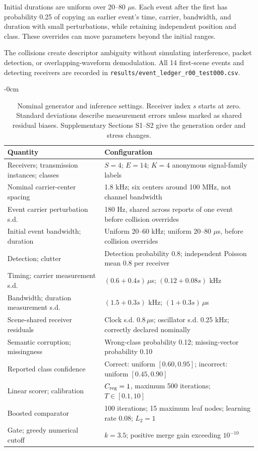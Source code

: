 Initial durations are uniform over 20--80 $\mu$s. Each event after the first has probability 0.25 of copying an earlier event's time, carrier, bandwidth, and duration with small perturbations, while retaining independent position and class. These overrides can move parameters beyond the initial ranges.

The collisions create descriptor ambiguity without simulating interference, packet detection, or overlapping-waveform demodulation. All 14 first-scene events and detecting receivers are recorded in \texttt{results/event\_ledger\_r00\_test000.csv}.

\begin{table}[!t]
\begin{adjustwidth}{-\extralength}{0cm}
\caption{Nominal generator and inference settings. Receiver index $s$ starts at zero. Standard deviations describe measurement errors unless marked as shared residual biases. Supplementary Sections S1--S2 give the generation order and stress changes.}\label{tab:configuration}
\small\renewcommand{\arraystretch}{1.12}
\begin{tabularx}{\linewidth}{@{}p{5.1cm}Y@{}}\toprule
Quantity & Configuration \\\midrule
Receivers; transmission instances; classes & $S=4$; $E=14$; $K=4$ anonymous signal-family labels \\
Nominal carrier-center spacing & 1.8 kHz; six centers around 100 MHz, not channel bandwidth \\
Event carrier perturbation s.d. & 180 Hz, shared across reports of one event before collision overrides \\
Initial event bandwidth; duration & Uniform 20--60 kHz; uniform 20--80 $\mu$s, before collision overrides \\
Detection; clutter & Detection probability 0.8; independent Poisson mean 0.8 per receiver \\
Timing; carrier measurement s.d. & $(0.6+0.4s)\,\mu$s; $(0.12+0.08s)$ kHz \\
Bandwidth; duration measurement s.d. & $(1.5+0.3s)$ kHz; $(1+0.3s)\,\mu$s \\
Scene-shared receiver residuals & Clock s.d. $0.8\,\mu$s; oscillator s.d. 0.25 kHz; correctly declared nominally \\
Semantic corruption; missingness & Wrong-class probability 0.12; missing-vector probability 0.10 \\
Reported class confidence & Correct: uniform $[0.60,0.95]$; incorrect: uniform $[0.45,0.90]$ \\
Linear scorer; calibration & $C_{\rm reg}=1$, maximum 500 iterations; $T\in[0.1,10]$ \\
Boosted comparator & 100 iterations; 15 maximum leaf nodes; learning rate 0.08; $L_2=1$ \\
Gate; greedy numerical cutoff & $k=3.5$; positive merge gain exceeding $10^{-10}$ \\\bottomrule
\end{tabularx}\end{adjustwidth}
\end{table}

